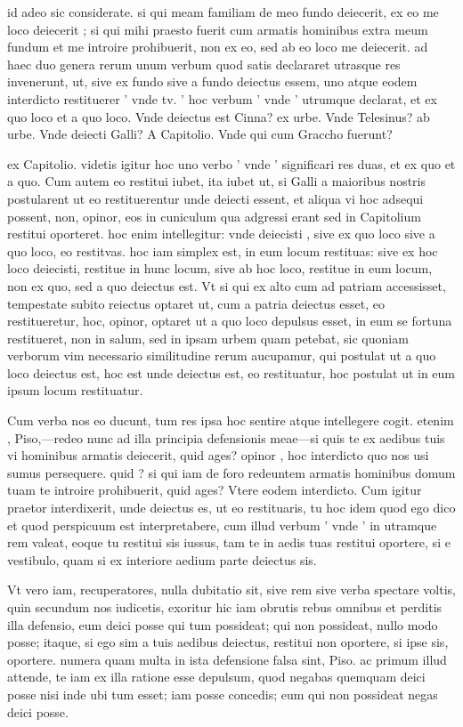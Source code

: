  id adeo sic considerate. si qui meam familiam de meo fundo deiecerit, ex eo me loco deiecerit ; si qui mihi praesto fuerit cum armatis hominibus extra meum fundum et me introire prohibuerit, non ex eo, sed ab eo loco me deiecerit. ad haec duo genera rerum unum verbum quod satis declararet utrasque res invenerunt, ut, sive ex fundo sive a fundo deiectus essem, uno atque eodem interdicto restituerer ' vnde tv. ' hoc verbum ' vnde ' utrumque declarat, et ex quo loco et a quo loco. Vnde deiectus est Cinna? ex urbe. Vnde Telesinus? ab urbe. Vnde deiecti Galli? A Capitolio. Vnde qui cum Graccho fuerunt?

 ex Capitolio. videtis igitur hoc uno verbo ' vnde ' significari res duas, et ex quo et a quo. Cum autem eo restitui iubet, ita iubet ut, si Galli a maioribus nostris postularent ut eo restituerentur unde deiecti essent, et aliqua vi hoc adsequi possent, non, opinor, eos in cuniculum qua adgressi erant sed in Capitolium restitui oporteret. hoc enim intellegitur: vnde deiecisti , sive ex quo loco sive a quo loco, eo restitvas. hoc iam simplex est, in eum locum restituas: sive ex hoc loco deiecisti, restitue in hunc locum, sive ab hoc loco, restitue in eum locum, non ex quo, sed a quo deiectus est. Vt si qui ex alto cum ad patriam accessisset, tempestate subito reiectus optaret ut, cum a patria deiectus esset, eo restitueretur, hoc, opinor, optaret ut a quo loco depulsus esset, in eum se fortuna restitueret, non in salum, sed in ipsam urbem quam petebat, sic quoniam verborum vim necessario similitudine rerum aucupamur, qui postulat ut a quo loco deiectus est, hoc est unde deiectus est, eo restituatur, hoc postulat ut in eum ipsum locum restituatur.

 Cum verba nos eo ducunt, tum res ipsa hoc sentire atque intellegere cogit. etenim , Piso,—redeo nunc ad illa principia defensionis meae—si quis te ex aedibus tuis vi hominibus armatis deiecerit, quid ages? opinor , hoc interdicto quo nos usi sumus persequere. quid ? si qui iam de foro redeuntem armatis hominibus domum tuam te introire prohibuerit, quid ages? Vtere eodem interdicto. Cum igitur praetor interdixerit, unde deiectus es, ut eo restituaris, tu hoc idem quod ego dico et quod perspicuum est interpretabere, cum illud verbum ' vnde ' in utramque rem valeat, eoque tu restitui sis iussus, tam te in aedis tuas restitui oportere, si e vestibulo, quam si ex interiore aedium parte deiectus sis.

 Vt vero iam, recuperatores, nulla dubitatio sit, sive rem sive verba spectare voltis, quin secundum nos iudicetis, exoritur hic iam obrutis rebus omnibus et perditis illa defensio, eum deici posse qui tum possideat; qui non possideat, nullo modo posse; itaque, si ego sim a tuis aedibus deiectus, restitui non oportere, si ipse sis, oportere. numera quam multa in ista defensione falsa sint, Piso. ac primum illud attende, te iam ex illa ratione esse depulsum, quod negabas quemquam deici posse nisi inde ubi tum esset; iam posse concedis; eum qui non possideat negas deici posse.

